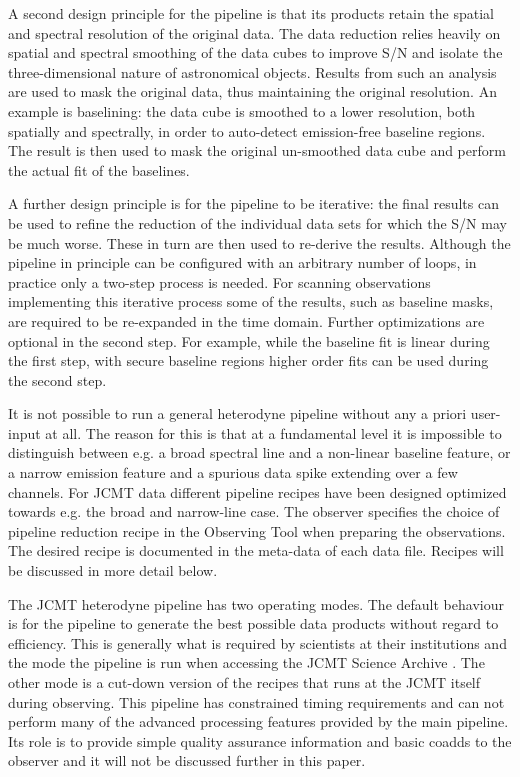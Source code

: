 \documentclass[final,authoryear,5p,times,twocolumn]{elsarticle}
\begin{document}
A second design principle for the pipeline is that its products
retain the spatial and spectral resolution of the original data.  The
data reduction relies heavily on spatial and spectral smoothing of the
data cubes to improve S/N and isolate the three-dimensional nature of astronomical
objects. Results from such an analysis are used to mask the original
data, thus maintaining the original resolution. An example is
baselining: the data cube is smoothed to a lower resolution,
both spatially and spectrally, in order to auto-detect emission-free
baseline regions. The result is then used to mask the original
un-smoothed data cube and perform the actual fit of the baselines.

A further design principle is for the pipeline to be iterative: the
final results can be used to refine the reduction of the individual data
sets for which the S/N may be much worse. These in turn are then used
to re-derive the results. Although the pipeline in principle can be
configured with an arbitrary number of loops, in practice only a
two-step process is needed. For scanning observations implementing
this iterative process some of the results, such as baseline masks,
are required to be re-expanded in the time domain. Further optimizations are optional in
the second step. For example, while the baseline fit is linear
during the first step, with secure baseline regions higher order fits
can be used during the second step.

It is not possible to run a general heterodyne pipeline without any a
priori user-input at all. The reason for this is that at a fundamental
level it is impossible to distinguish between e.g. a broad spectral
line and a non-linear baseline feature, or a narrow emission feature
and a spurious data spike extending over a few channels. For JCMT data
different pipeline recipes have been designed optimized towards
e.g. the broad and narrow-line case. The observer specifies the choice
of pipeline reduction recipe in the Observing Tool when preparing the
observations. The desired recipe is documented in the meta-data of
each data file. Recipes will be discussed in more detail below.

The JCMT heterodyne pipeline has two operating modes. The default
behaviour is for the pipeline to generate the best possible data
products without regard to efficiency. This is generally what is
required by scientists at their institutions and the mode the pipeline is run
when accessing the JCMT Science Archive
\citep[JSA;][]{2008ASPC..394..135G,2008ASPC..394..565J}. The other mode is a
cut-down version of the recipes that runs at the JCMT itself during
observing. This pipeline has constrained timing requirements and can
not perform many of the advanced processing features provided by the
main pipeline. Its role is to provide simple quality assurance
information and basic coadds to the observer and it will not be
discussed further in this paper.
\end{document}
